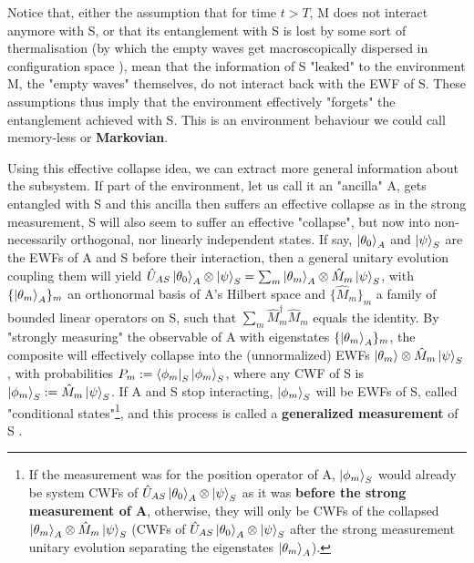 \documentclass[11pt, a4paper]{article} %
\begin{document}
Notice that, either the assumption that for time $t>T$, M does not interact anymore with S, or that its entanglement with S is lost by some sort of thermalisation (by which the empty waves get macroscopically dispersed in configuration space \cite{Absolute}), mean that the information of S "leaked" to the environment M, the "empty waves" themselves, do not interact back with the EWF of S. These assumptions thus imply that the environment effectively "forgets" the entanglement achieved with S. This is an environment behaviour we could call memory-less or {\bf Markovian}. 

Using this effective collapse idea, we can extract more general information about the subsystem. If part of the environment, let us call it an "ancilla" A, gets entangled with S and this ancilla then suffers an effective collapse as in the strong measurement, S will also seem to suffer an effective "collapse", but now into non-necessarily orthogonal, nor linearly independent states. If say, $\ket{\theta_0}_A$ and $\ket{\psi}_S$ are the EWFs of A and S before their interaction, then a general unitary evolution coupling them will yield $\hat{U}_{AS}\ket{\theta_0}_A\otimes\ket{\psi}_S=\sum_m \ket{\theta_m}_A\otimes \hat{M}_m\ket{\psi}_S$, with $\{\ket{\theta_m}_A\}_m$ an orthonormal basis of A's Hilbert space and $\{\hat{M}_m\}_m$ a family of bounded linear operators on S, such that $\sum_m\hat{M}_m^\dagger\hat{M}_m$ equals the identity. By "strongly measuring" the observable of A with eigenstates $\{\ket{\theta_m}_A\}_m$, the composite will effectively collapse into the (unnormalized) EWFs $\ket{\theta_m}\otimes \hat{M}_m\ket{\psi}_S$, with probabilities $P_m:=\bra{\phi_m}_S\ket{\phi_m}_S$, where any CWF of S is $\ket{\phi_m}_S:=\hat{M}_m\ket{\psi}_S$. If A and S stop interacting, $\ket{\phi_m}_S$ will be EWFs of S, called "conditional states"\footnote{If the measurement was for the position operator of A, $\ket{\phi_m}_S$ would already be system CWFs of $\hat{U}_{AS}\ket{\theta_0}_A\otimes\ket{\psi}_S$ as it was {\bf before the strong measurement of A}, otherwise, they will only be CWFs of the collapsed $\ket{\theta_m}_A\otimes \hat{M}_m\ket{\psi}_S$ (CWFs of $\hat{U}_{AS}\ket{\theta_0}_A\otimes\ket{\psi}_S$ after the strong measurement unitary evolution separating the eigenstates $\ket{\theta_m}_A$).}, and this process is called a {\bf generalized measurement} of S \cite{Generalized, operatorsObservables}.
\end{document}
